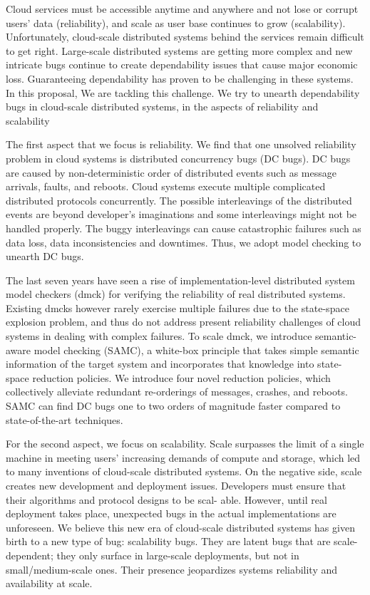 Cloud services must be accessible anytime and anywhere and not lose or corrupt
users' data (reliability), and scale as user base continues to grow
(scalability). Unfortunately, cloud-scale distributed systems behind the
services remain difficult to get right. Large-scale distributed systems are
getting more complex and new intricate bugs continue to create dependability
issues that cause major economic loss. Guaranteeing dependability has proven to
be challenging in these systems. In this proposal, We are tackling this
challenge. We try to unearth dependability bugs in cloud-scale distributed
systems, in the aspects of reliability and scalability

The first aspect that we focus is reliability. We find that one
unsolved reliability problem in cloud systems is distributed concurrency bugs
(DC bugs). DC bugs are caused by non-deterministic order of distributed events
such as message arrivals, faults, and reboots. Cloud systems execute multiple
complicated distributed protocols concurrently. The possible interleavings of
the distributed events are beyond developer's imaginations and some
interleavings might not be handled properly. The buggy interleavings can cause
catastrophic failures such as data loss, data inconsistencies and downtimes.
Thus, we adopt model checking to unearth DC bugs.

The last seven years have seen a rise of implementation-level distributed system
model checkers (dmck) for verifying the reliability of real distributed systems.
Existing dmcks however rarely exercise multiple failures due to the state-space
explosion problem, and thus do not address present reliability challenges of
cloud systems in dealing with complex failures. To scale dmck, we introduce
semantic-aware model checking (SAMC), a white-box principle that takes simple
semantic information of the target system and incorporates that knowledge into
state-space reduction policies. We introduce four novel reduction policies,
which collectively alleviate redundant re-orderings of messages, crashes, and
reboots. SAMC can find DC bugs one to two orders of magnitude faster compared to
state-of-the-art techniques. 

For the second aspect, we focus on scalability. Scale surpasses the limit
of a single machine in meeting users' increasing demands of compute and storage,
which led to many inventions of cloud-scale distributed systems.  On the
negative side, scale creates new development and deployment issues.  Developers
must ensure that their algorithms and protocol designs to be scal- able.
However, until real deployment takes place, unexpected bugs in the actual
implementations are unforeseen. We believe this new era of cloud-scale
distributed systems has given birth to a new type of bug: scalability bugs.
They are latent bugs that are scale-dependent; they only surface in large-scale
deployments, but not in small/medium-scale ones. Their presence jeopardizes
systems reliability and availability at scale.

